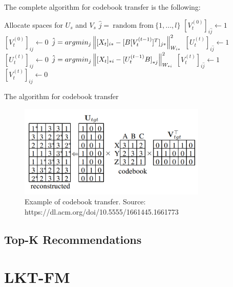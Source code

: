 The complete algorithm for codebook transfer is the following:
\vskip 0.7cm
\begin{algorithm}[H]
Allocate spaces for $U_s$ and $V_s$\;
{
  $\hat{j} =\ \text{random from}\ \{1,...,l\}$\;
  $[V^{(0)}_t]_{i\hat{j}} \gets 1$\;
  {
    $[V^{(0)}_t]_{ij} \gets 0$\;
  }
}
{
  {
    $\hat{j} = argmin_j\left\lVert[X_t]_{i*} - [B [V^{(t - 1)}_t]^T]_{j*}\right\rVert^2_{W_{i*}}$\;
    $[U^{(t)}_t]_{i\hat{j}} \gets 1$\;
    {
      $[U^{(t)}_t]_{ij} \gets 0$\;
    }
  }
  {
    $\hat{j} = argmin_j\left\lVert[X_t]_{*i} - {[U^{(t - 1)}_t B]}_{*j}\right\rVert^2_{W_{*i}}$\;
    $[V^{(t)}_t]_{i\hat{j}} \gets 1$\;
    {
      $[V^{(t)}_t]_{ij} \gets 0$\;
    }
  }
}

\caption{The algorithm for codebook transfer}
\end{algorithm}
\vskip 0.7cm
\begin{figure}[hbt!]
  \centering
  \includegraphics[width=0.8\textwidth]{pictures/codebook-transfer}
  \caption{Example of codebook transfer. Source: https://dl.acm.org/doi/10.5555/1661445.1661773}
\end{figure}


\subsection{Top-K Recommendations}



\section{LKT-FM}